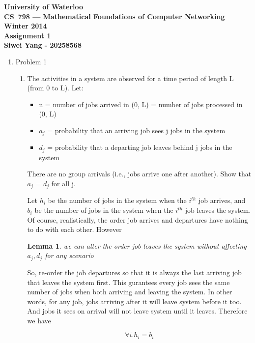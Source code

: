 \documentclass[letterpaper]{article}
\newtheorem{lem}[thm]{Lemma}
\begin{document}
\begin{center}
\large\bf University of Waterloo\\
CS~798 --- Mathematical Foundations of Computer Networking\\
Winter 2014\\
Assignment 1\\
Siwei Yang - 20258568\\
\end{center}
\bigskip

\begin{enumerate}
\item{Problem 1}

\begin{enumerate}
\item{} The activities in a system are observed for a time period of length L (from 0 to L).
Let:
\begin{itemize}
\item n = number of jobs arrived in (0, L) = number of jobs processed in (0, L) 
\item $a_j$ = probability that an arriving job sees j jobs in the system
\item $d_j$ = probability that a departing job leaves behind j jobs in the system
\end{itemize}
There are no group arrivals (i.e., jobs arrive one after another). Show that $a_j$ = $d_j$ for all j.

Let $h_i$ be the number of jobs in the system when the $i^{th}$ job arrives, and $b_i$ be the number of jobs in the system when the $i^{th}$ job leaves the system. Of course, realistically, the order job arrives and departures have nothing to do with each other. However

\begin{lem}
we can alter the order job leaves the system without affecting $a_j, d_j$
for any scenario
\end{lem}

So, re-order the job departures so that it is always the last arriving job that leaves the system first. This gurantees every job sees the same number of jobs when both arriving and leaving the system. In other words, for any job, jobs arriving after it will leave system before it too. And jobs it sees on arrival will not leave system until it leaves. Therefore we have

\begin{equation}
\forall i . h_i = b_i
\end{equation}


\end{enumerate}
\end{enumerate}
\end{document}
